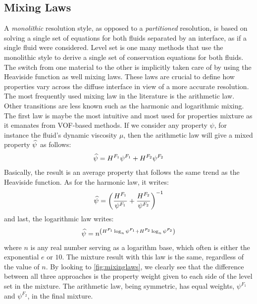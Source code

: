 \subsection{Mixing Laws} 
\label{sec:mixinglaws}
A \emph{monolithic} resolution style, as opposed to a \emph{partitioned} resolution, is based on solving a single set of equations
for both fluids separated by an interface, as if a single fluid were considered. 
Level set is one many methods that use the monolithic style to derive a single set of conservation equations
for both fluids. The switch from one material to the other is implicitly taken care of by using the Heaviside function as well mixing laws. These laws
are crucial to define how properties vary across the diffuse interface in view of a more accurate resolution.
The most frequently used mixing law in the literature is the arithmetic law. Other transitions are less known such as 
the harmonic and logarithmic mixing. The first law is maybe the most intuitive and most used for properties mixture as it emanates
from VOF-based methods. 
If we consider any property $\psi$, for instance the fluid's dynamic viscosity $\mu$, then the arithmetic 
law will give a mixed property $\widehat{\psi}$ as follows:
\begin{align}
\label{eq:arithmetic}
\widehat{\psi} = H^{F_1} \psi^{F_1} + H^{F_2} \psi^{F_2}
\end{align}
Basically, the result is an average property that follows the same trend as the Heaviside function. As for the harmonic law, it writes:
\begin{align}
\label{eq:harmonic}
\widehat{\psi} = \left( \frac{H^{F_1}}{\psi^{F_1}} + \frac{H^{F_2}}{\psi^{F_2}}  \right)^{-1}
\end{align}
and last, the logarithmic law writes:
\begin{align}
\label{eq:logarithmic}
\widehat{\psi} =  n^{\left( H^{F_1} \log_n \psi^{F_1} + H^{F_2} \log_n \psi^{F_2} \right)}
\end{align}
where $n$ is any real number serving as a logarithm base, which often is either the exponential $e$ or $10$.
The mixture result with this law is the same, regardless of the value of $n$.
By looking to \cref{fig:mixinglaws}, we clearly see that the difference between all three approaches is the property weight given to each side 
of the level set in the mixture. The arithmetic law, being symmetric, has equal weights, $\psi^{F_1}$ and $\psi^{F_2}$, in the final mixture. 
